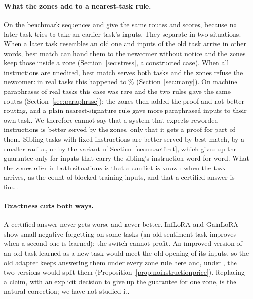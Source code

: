 \paragraph{What the zones add to a nearest-task rule.} On the benchmark sequences \nearest{} and
\cert{} give the same routes and scores, because no later task tries to take an earlier task's inputs.
They separate in two situations. When a later task resembles an old one and inputs of the old task
arrive in other words, best match can hand them to the newcomer without notice and the zones keep those
inside a zone (Section~\ref{sec:stress}, a constructed case). When all instructions are unedited, best
match serves both tasks and the zones refuse the newcomer: in \ManyTasks{} real tasks this happened to
\ManyCollidingPct{}\% (Section~\ref{sec:many}). On machine paraphrases of \WidenTasksEval{} real tasks
this case was rare and the two rules gave the same routes (Section~\ref{sec:paraphrase}); the zones then
added the proof and not better routing, and a plain nearest-signature rule gave more paraphrased inputs to their own task. We therefore cannot say that a system that expects reworded instructions is better served by the zones, only that it gets a proof for part of them. Sibling tasks with fixed instructions are better served by best
match, by a smaller radius, or by the variant of Section~\ref{sec:exactfirst}, which gives up the guarantee only for inputs that carry the sibling's instruction word for word. What the zones offer in
both situations is that a conflict is known when the task arrives, as the count of blocked training
inputs, and that a certified answer is final.

\paragraph{Exactness cuts both ways.} A certified answer never gets worse and never better. InfLoRA and
GainLoRA show small negative forgetting on some tasks (an old sentiment task improves when a second one
is learned); the switch cannot profit. An improved version of an old task learned as a new task would
meet the old opening of its inputs, so the old adapter keeps answering them under every zone rule here
and, under \recog{}, the two versions would split them (Proposition~\ref{prop:noinstructionprice}).
Replacing a claim, with an explicit decision to give up the guarantee for one zone, is the natural
correction; we have not studied it.

